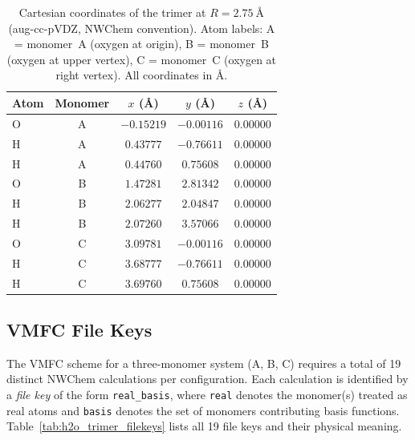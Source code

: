 \begin{table}[!ht]
    \centering
    \caption{Cartesian coordinates of the  trimer at
    $R = \SI{2.75}{\angstrom}$ (aug-cc-pVDZ, NWChem convention).
    Atom labels: A = monomer~A (oxygen at origin), B = monomer~B
    (oxygen at upper vertex), C = monomer~C (oxygen at right vertex).
    All coordinates in \AA.}
    \label{tab:h2o_trimer_geometry}
    \begin{tabular}{lcccc}
        \toprule
        Atom & Monomer & $x$ (\AA) & $y$ (\AA) & $z$ (\AA) \\
        \midrule
        O & A & $-0.15219$ & $-0.00116$ & $0.00000$ \\
        H & A & $ 0.43777$ & $-0.76611$ & $0.00000$ \\
        H & A & $ 0.44760$ & $ 0.75608$ & $0.00000$ \\
        O & B & $ 1.47281$ & $ 2.81342$ & $0.00000$ \\
        H & B & $ 2.06277$ & $ 2.04847$ & $0.00000$ \\
        H & B & $ 2.07260$ & $ 3.57066$ & $0.00000$ \\
        O & C & $ 3.09781$ & $-0.00116$ & $0.00000$ \\
        H & C & $ 3.68777$ & $-0.76611$ & $0.00000$ \\
        H & C & $ 3.69760$ & $ 0.75608$ & $0.00000$ \\
        \bottomrule
    \end{tabular}
\end{table}



\subsection{VMFC File Keys}

The VMFC scheme for a three-monomer system (A, B, C) requires a total
of 19 distinct NWChem calculations per configuration. Each calculation
is identified by a \textit{file key} of the form \texttt{real\_basis},
where \texttt{real} denotes the monomer(s) treated as real atoms and
\texttt{basis} denotes the set of monomers contributing basis
functions. Table~\ref{tab:h2o_trimer_filekeys} lists all 19 file keys
and their physical meaning.


